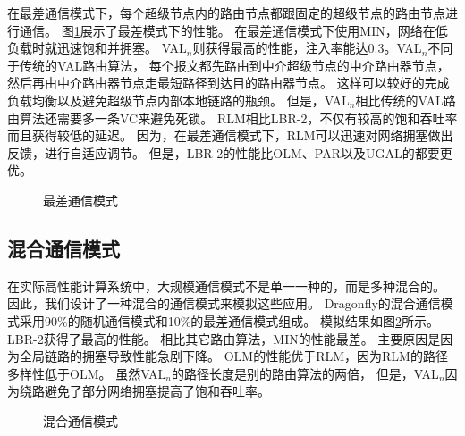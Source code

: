 在最差通信模式下，每个超级节点内的路由节点都跟固定的超级节点的路由节点进行通信。
图\ref{fig:adversarial}展示了最差模式下的性能。
在最差通信模式下使用MIN，网络在低负载时就迅速饱和并拥塞。
VAL$_n$则获得最高的性能，注入率能达0.3。VAL$_n$不同于传统的VAL路由算法，
每个报文都先路由到中介超级节点的中介路由器节点，
然后再由中介路由器节点走最短路径到达目的路由器节点。
这样可以较好的完成负载均衡以及避免超级节点内部本地链路的瓶颈。
但是，VAL$_n$相比传统的VAL路由算法还需要多一条VC来避免死锁。
RLM相比LBR-2，不仅有较高的饱和吞吐率而且获得较低的延迟。
因为，在最差通信模式下，RLM可以迅速对网络拥塞做出反馈，进行自适应调节。
但是，LBR-2的性能比OLM、PAR以及UGAL的都要更优。

\begin{figure}[htbp]
  \centering
  \begin{minipage}[t]{\textwidth}
    \centering
    \caption{最差通信模式}
    \label{fig:adversarial}
  \end{minipage}
\end{figure}
\subsection{混合通信模式}

在实际高性能计算系统中，大规模通信模式不是单一一种的，而是多种混合的。
因此，我们设计了一种混合的通信模式来模拟这些应用。
Dragonfly的混合通信模式采用90\%的随机通信模式和10\%的最差通信模式组成。
模拟结果如图\ref{fig:blended}所示。LBR-2获得了最高的性能。
相比其它路由算法，MIN的性能最差。
主要原因是因为全局链路的拥塞导致性能急剧下降。
OLM的性能优于RLM，因为RLM的路径多样性低于OLM。
虽然VAL$_n$的路径长度是别的路由算法的两倍，
但是，VAL$_n$因为绕路避免了部分网络拥塞提高了饱和吞吐率。

\begin{figure}[htbp]
  \centering
  \begin{minipage}[t]{\textwidth}
    \centering
    \caption{混合通信模式}
    \label{fig:blended}
  \end{minipage}
\end{figure}

